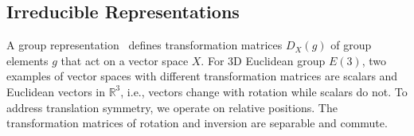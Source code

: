 \vspace{-2.5mm}
\subsection{Irreducible Representations}
\vspace{-2.5mm}
\label{subsec:irreducible_representations}
A group representation~\citep{Dresselhaus2007, zee} defines transformation matrices $D_{X}(g)$ of group elements $g$ that act on a vector space $X$. 
For 3D Euclidean group $E(3)$, two examples of vector spaces with different transformation matrices are scalars and Euclidean vectors in $\mathbb{R}^3$, i.e., vectors change with rotation while scalars do not.
To address translation symmetry, we operate on relative positions.
The transformation matrices of rotation and inversion are separable and commute. 
